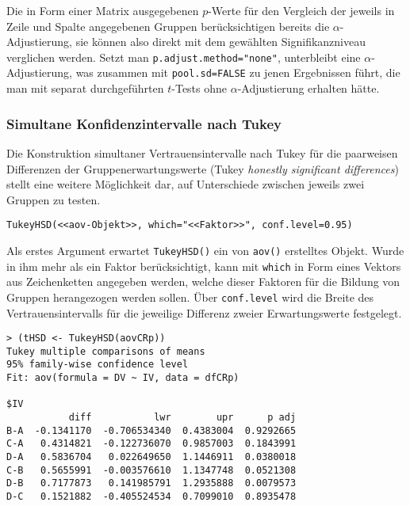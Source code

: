 Die in Form einer Matrix ausgegebenen $p$-Werte für den Vergleich der jeweils in Zeile und Spalte angegebenen Gruppen berücksichtigen bereits die $\alpha$-Adjustierung, sie können also direkt mit dem gewählten Signifikanzniveau verglichen werden. Setzt man \lstinline!p.adjust.method="none"!, unterbleibt eine $\alpha$-Adjustierung, was zusammen mit \lstinline!pool.sd=FALSE! zu jenen Ergebnissen führt, die man mit separat durchgeführten $t$-Tests ohne $\alpha$-Adjustierung erhalten hätte.

\subsubsection{Simultane Konfidenzintervalle nach Tukey}
\label{sec:tukey}

Die Konstruktion simultaner Vertrauensintervalle nach Tukey für die paarweisen Differenzen der Gruppenerwartungswerte (Tukey \emph{honestly significant differences}) stellt eine weitere Möglichkeit dar, auf Unterschiede zwischen jeweils zwei Gruppen zu testen.
\begin{lstlisting}
TukeyHSD(<<aov-Objekt>>, which="<<Faktor>>", conf.level=0.95)
\end{lstlisting}

Als erstes Argument erwartet \lstinline!TukeyHSD()! ein von \lstinline!aov()! erstelltes Objekt. Wurde in ihm mehr als ein Faktor berücksichtigt, kann mit \lstinline!which! in Form eines Vektors aus Zeichenketten angegeben werden, welche dieser Faktoren für die Bildung von Gruppen herangezogen werden sollen. Über \lstinline!conf.level! wird die Breite des Vertrauensintervalls für die jeweilige Differenz zweier Erwartungswerte festgelegt.
\begin{lstlisting}
> (tHSD <- TukeyHSD(aovCRp))
Tukey multiple comparisons of means
95% family-wise confidence level
Fit: aov(formula = DV ~ IV, data = dfCRp)

$IV
           diff           lwr        upr      p adj
B-A  -0.1341170  -0.706534340  0.4383004  0.9292665
C-A   0.4314821  -0.122736070  0.9857003  0.1843991
D-A   0.5836704   0.022649650  1.1446911  0.0380018
C-B   0.5655991  -0.003576610  1.1347748  0.0521308
D-B   0.7177873   0.141985791  1.2935888  0.0079573
D-C   0.1521882  -0.405524534  0.7099010  0.8935478
\end{lstlisting}

